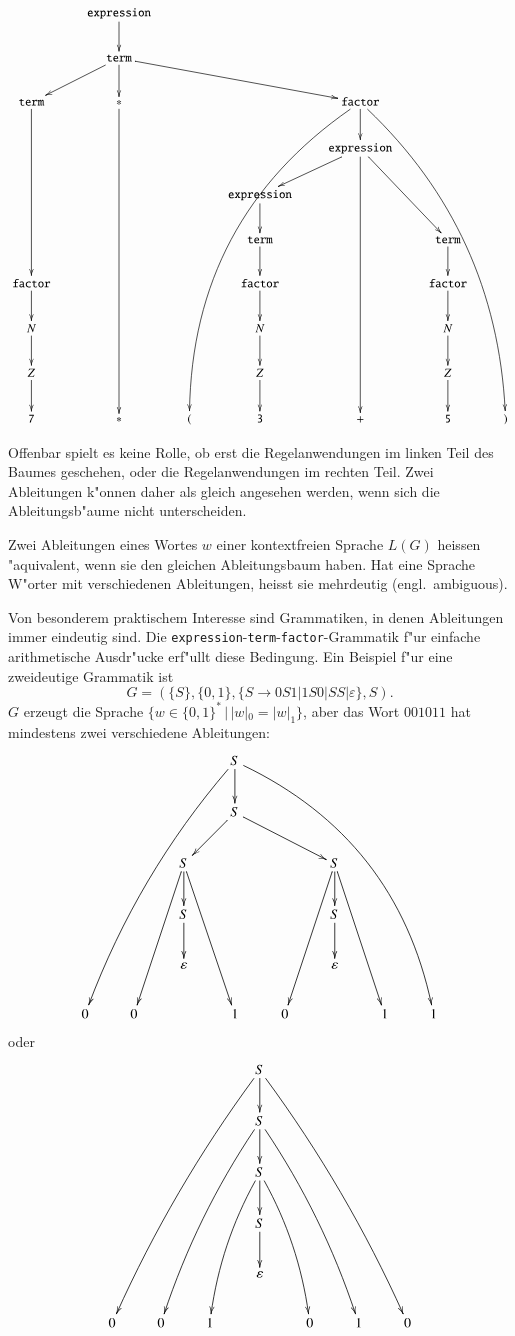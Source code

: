 {
\tiny
\[
\xymatrix{
	&{\tt expression} \ar[d]
\\
	&{\tt term} \ar[dl] \ar[d] \ar[drrr]
\\
{\tt term}\ar[dddd]
	&{\tt *}\ar[ddddddd]
		&
			&
				&{\tt factor}\ar@/_40pt/[dddddddll]\ar[d]\ar@/^30pt/[dddddddrr]
					&
						&
\\
	&
		&
			&
				&{\tt expression}\ar[dl]\ar[dddddd]\ar[ddr]
					&
\\
	&
		&
			&{\tt expression}\ar[d]
				&
					&
						&
\\
	&
		&
			&{\tt term}\ar[d]
				&
					&{\tt term}\ar[d]
						&
\\
{\tt factor}\ar[d]
	&
		&
			&{\tt factor}\ar[d]
				&
					&{\tt factor}\ar[d]
						&
\\
N\ar[d]
	&
		&
			&N\ar[d]
				&
					&N\ar[d]
						&
\\
Z\ar[d]
	&
		&
			&Z\ar[d]
				&
					&Z\ar[d]
						&
\\
{\tt 7}
	&{\tt *}
		&{\tt (}
			&{\tt 3}
				&{\tt +}
					&{\tt 5}
						&{\tt )}
}
\]
}

Offenbar spielt es keine Rolle, ob erst die Regelanwendungen
im linken Teil des Baumes geschehen, oder die Regelanwendungen im
rechten Teil. Zwei Ableitungen k"onnen daher als gleich angesehen
werden, wenn sich die Ableitungsb"aume nicht unterscheiden.

\begin{definition}
Zwei Ableitungen eines Wortes $w$ einer kontextfreien Sprache $L(G)$
heissen "aquivalent, wenn sie den gleichen Ableitungsbaum haben.
Hat eine Sprache W"orter mit verschiedenen Ableitungen, heisst
sie mehrdeutig (engl.~ambiguous).
\end{definition}

Von besonderem praktischem Interesse sind Grammatiken, in denen
Ableitungen immer eindeutig sind. Die
{\tt expression}-{\tt term}-{\tt factor}-Grammatik f"ur einfache
arithmetische Ausdr"ucke erf"ullt diese Bedingung. 
Ein Beispiel f"ur eine zweideutige Grammatik ist
\[
G=(\{S\}, \{0,1\}, \{S\to 0S1|1S0|SS|\varepsilon\}, S).
\]
$G$ erzeugt die Sprache
$\{w\in \{0,1\}^*\,|\, |w|_0 = |w|_1\}$, aber das Wort
$001011$ hat mindestens zwei verschiedene Ableitungen:
\[
\xymatrix{
&&&S\ar@/_10pt/[dddddlll]\ar[d]\ar@/^30pt/[dddddrrrr]
\\
&&&S\ar[dl]\ar[drr]
\\
 &&S\ar[dddl]\ar[d]\ar[dddr]&&&S\ar[dddl]\ar[d]\ar[dddr]&&
\\
&&S\ar[d]&&&S\ar[d]&&
\\
 & &\varepsilon& & &\varepsilon& & 
\\
0&0&           &1&0&           &1&1
}
\]
oder
\[
\xymatrix{
&&&S\ar@/_/[dddddlll]\ar[d]\ar@/^/[dddddrrr]
\\
&&&S\ar@/_/[ddddll]\ar[d]\ar@/^/[ddddrr]&&&
\\
&&&S\ar@/_/[dddl]\ar[d]\ar@/^/[dddr]&&&
\\
&&&S\ar[d]&&&
\\
&&&\varepsilon&&&
\\
0&0&1&&0&1&0
}
\]


